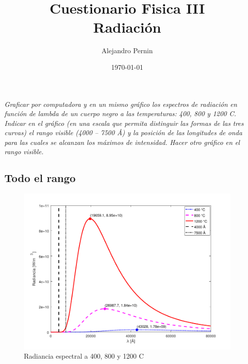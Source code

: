 \documentclass[12pt,a4paper]{article}
\title{Cuestionario Fisica III \\ Radiación}
\author{
        Alejandro Pernin
}
\date{\today}
\begin{document}

	\maketitle


	\section{}\label{1}
		\textit{
		Graficar por computadora y en un mismo gráfico los espectros de radiación en función
		de lambda de un cuerpo negro a las temperaturas: 400, 800 y 1200 \textdegree C. Indicar en el gráfico
		(en una escala que permita distinguir las formas de las tres curvas) el rango visible (4000 –
		7500 Å) y la posición de las longitudes de onda para las cuales se alcanzan los máximos de
		intensidad. Hacer otro gráfico en el rango visible.
		}



		\subsection{Todo el rango}
			\begin{figure}[H]
				\centering\includegraphics[scale=1]{images/todo.pdf}\caption{Radiancia espectral a 400, 800 y 1200 \textdegree C}
			\end{figure}
	
\end{document}
